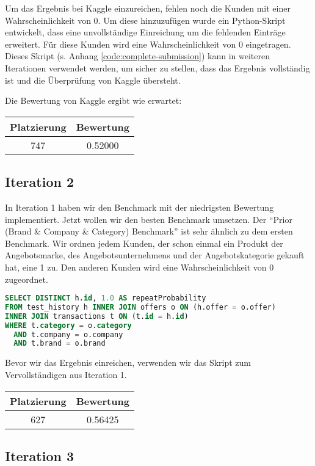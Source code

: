 Um das Ergebnis bei Kaggle einzureichen, fehlen noch die Kunden mit einer Wahrscheinlichkeit von 0.
Um diese hinzuzufügen wurde ein Python-Skript entwickelt, dass eine unvollständige Einreichung
um die fehlenden Einträge erweitert. Für diese Kunden wird eine Wahrscheinlichkeit von 0 eingetragen.
Dieses Skript (s. Anhang \ref{code:complete-submission}) kann in weiteren Iterationen verwendet werden,
um sicher zu stellen, dass das Ergebnis vollständig ist und die Überprüfung von Kaggle übersteht. 

Die Bewertung von Kaggle ergibt wie erwartet:

\begin{tabular}{|c|c|}
	\hline \textbf{Platzierung} & \textbf{Bewertung} \\ 
	\hline 747 & 0.52000  \\ 
	\hline 
\end{tabular}

\subsection{Iteration 2}

In Iteration 1 haben wir den Benchmark mit der niedrigsten Bewertung implementiert. Jetzt wollen wir 
den besten Benchmark umsetzen. Der "`Prior (Brand \& Company \& Category) Benchmark"' ist sehr ähnlich
zu dem ersten Benchmark. Wir ordnen jedem Kunden, der schon einmal ein Produkt der Angebotsmarke,
des Angebotsunternehmens und der Angebotskategorie gekauft hat, eine 1 zu. Den anderen Kunden wird
eine Wahrscheinlichkeit von 0 zugeordnet.

\begin{lstlisting}[language=SQL]
SELECT DISTINCT h.id, 1.0 AS repeatProbability
FROM test_history h INNER JOIN offers o ON (h.offer = o.offer)
INNER JOIN transactions t ON (t.id = h.id)
WHERE t.category = o.category
  AND t.company = o.company
  AND t.brand = o.brand
\end{lstlisting}

Bevor wir das Ergebnis einreichen, verwenden wir das Skript zum Vervollständigen aus Iteration 1.

\begin{tabular}{|c|c|}
	\hline \textbf{Platzierung} & \textbf{Bewertung} \\ 
	\hline 627 & 0.56425  \\ 
	\hline 
\end{tabular}

\subsection{Iteration 3}

